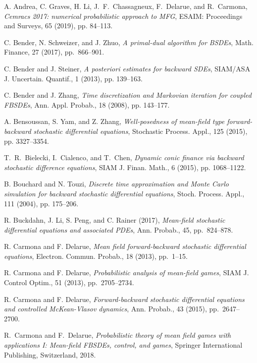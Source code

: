 \documentclass[11pt]{article}
\numberwithin{equation}{section}
\theoremstyle{definition}
\theoremstyle{remark}
\begin{document}
%
%
\begin{thebibliography}{1}

A. Andrea, C. Graves, H. Li, J.~F.~Chassagneux, F.~Delarue, and
R.~Carmona, \emph{Cemracs 2017: numerical probabilistic approach to MFG}, ESAIM:
Proceedings and Surveys, 65  (2019), pp. 84--113. 


C. Bender, N. Schweizer, and J. Zhuo, \emph{A primal-dual algorithm for BSDEs}, Math. Finance,
27 (2017), pp.~866--901.

C. Bender and J. Steiner, \emph{A posteriori estimates for backward SDEs}, SIAM/ASA J. Uncertain. Quantif.,
1 (2013), pp. 139--163.

C. Bender and J. Zhang, \emph{Time discretization and Markovian iteration for coupled FBSDEs},
Ann. Appl. Probab., 18 (2008), pp. 143--177.


A. Bensoussan, S. Yam,  and Z. Zhang, \emph{Well-posedness of mean-field type forward-backward stochastic differential equations}, Stochastic Process. Appl., 125  (2015),
pp. 3327--3354.

T.~R.~Bielecki,  I.~Cialenco, and T.~Chen, \emph{Dynamic conic finance via backward stochastic difference equations},
SIAM J. Finan. Math., 6 (2015), pp. 1068--1122.

B. Bouchard and N. Touzi, 
\emph{Discrete time approximation and Monte Carlo simulation for backward
stochastic differential equations}, Stoch. Process. Appl., 111 (2004), pp. 175--206.


R. Buckdahn, J. Li, S. Peng, and C. Rainer (2017), \emph{Mean-field stochastic differential equations
and associated PDEs}, Ann. Probab., 45, pp.~824--878.


R. Carmona and F. Delarue, \emph{Mean field forward-backward stochastic differential equations},
Electron. Commun. Probab., 18 (2013), pp.~1--15.

R. Carmona and F. Delarue, \emph{Probabilistic analysis of mean-field games},
  SIAM J. Control Optim., 51 (2013), pp.~2705--2734. 


R. Carmona and F. Delarue, \emph{Forward-backward stochastic differential equations and controlled McKean-Vlasov dynamics},
Ann. Probab., 43 (2015), pp.~2647--2700. 
  
R.\ Carmona and F.\ Delarue, \emph{Probabilistic theory of mean field games with applications I: Mean-field FBSDEs, control, and games}, Springer International Publishing, Switzerland, 2018.
 




\end{thebibliography}
\end{document}

